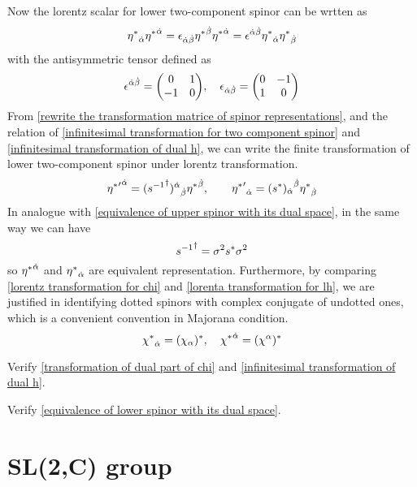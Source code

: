 Now the lorentz scalar for lower two-component spinor can be wrtten as 
\begin{equation}
{\eta^*}_{\dot{\alpha}}{\eta^*}^{\dot{\alpha}} 
= \epsilon_{\dot{\alpha}\dot{\beta}}{\eta^*}^{\dot{\beta}}{\eta^*}^{\dot{\alpha}}
= \epsilon^{\dot{\alpha}\dot{\beta}}{\eta^*}_{\dot{\alpha}}{\eta^*}_{\dot{\beta}}
\end{equation}
with the antisymmetric tensor defined as 
\begin{equation}
\e^{\doa\dob} = \mqty(0 & 1 \\ -1 & 0),\quad
\e_{\doa\dob} =\mqty(0 & -1 \\ 1 & 0)
\end{equation}
From \eqref{rewrite the transformation matrice of spinor representations}, and the relation of \eqref{infinitesimal transformation for two component spinor} and \eqref{infinitesimal transformation of dual h}, we can write the finite transformation of lower two-component spinor under lorentz transformation.
\begin{equation}\label{lorenta transformation for lh}
{{\eta^*}'}^{\dot{\alpha}} = {({s^{-1}}^{\dagger})^{\dot{\alpha}}}_{\dot{\beta}}{\eta^*}^{\dot{\beta}}
,\qquad
{{\eta^*}'}_{\dot{\alpha}} = {(s^{*})_{\dot{\alpha}}}^{\dot{\beta}}{\eta^*}_{\dot{\beta}}
\end{equation}
In analogue with \eqref{equivalence of upper spinor with its dual space}, in the same way we can have 
\begin{equation}\label{equivalence of lower spinor with its dual space}
{s^{-1}}^{\dagger} = \sigma^2 s^* \sigma^2
\end{equation} 
so ${\eta^*}^{\dot{\alpha}}$ and ${\eta^*}_{\dot{\alpha}}$ are equivalent representation.
Furthermore, by comparing \eqref{lorentz transformation for chi} and \eqref{lorenta transformation for lh}, we are justified in identifying dotted spinors with complex conjugate of undotted ones, which is a convenient convention in Majorana condition.
\begin{equation}
{\chi^*}_{\dot{\alpha}} = (\chi_{\alpha})^*
,\quad
{\chi^*}^{\dot{\alpha}} = (\chi^{\alpha})^*
\end{equation}

\begin{Exe}\qquad
	
	Verify \eqref{transformation of dual part of chi} and \eqref{infinitesimal transformation of dual h}.
\end{Exe}
 
\begin{Exe}\qquad
	
    Verify \eqref{equivalence of lower spinor with its dual space}.
\end{Exe}

\section{SL(2,C) group}

